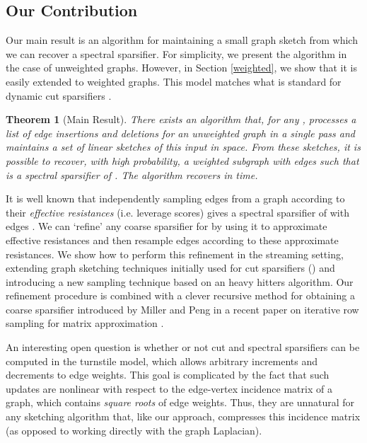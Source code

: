 \documentclass[11pt]{article}
\newtheorem{theorem}{Theorem}
\begin{document}
\subsection{Our Contribution}

Our main result is an algorithm for maintaining a small graph sketch from which we can recover a spectral sparsifier. For simplicity, we present the algorithm in the case of unweighted graphs. However, in Section \ref{weighted}, we show that it is easily extended to weighted graphs. This model matches what is standard for dynamic cut sparsifiers  \cite{gssss,goel2012single}. 

\begin{theorem}[Main Result]
\label{main_sparsification_theorem} There exists an algorithm that, for any , processes a  list of edge insertions and deletions for an unweighted graph  in a single pass and maintains a set of linear sketches of this input in  space. From these sketches, it is possible to recover, with high probability, a weighted subgraph  with  edges such that  is a  spectral sparsifier of . The algorithm 
recovers  in  time.
\end{theorem}

It is well known that independently sampling edges from a graph  according to their \emph{effective resistances} (i.e. leverage scores) gives a  spectral sparsifier of  with  edges \cite{graphSparsificationEffectiveResistance}. We can `refine' any coarse sparsifier for  by using it to approximate effective resistances and then resample edges according to these approximate resistances. We show how to perform this refinement in the streaming setting, extending graph sketching techniques initially used for cut sparsifiers (\cite{gssss,goel2012single}) and introducing a new sampling technique based on an  heavy hitters algorithm. Our refinement procedure is combined with a clever recursive method for obtaining a coarse sparsifier introduced by Miller and Peng in a recent paper on iterative row sampling for matrix approximation \cite{pengV1}.

An interesting open question is whether or not cut and spectral sparsifiers can be computed in the turnstile model, which allows arbitrary increments and decrements to edge weights. This goal is complicated by the fact that such updates are nonlinear with respect to the edge-vertex incidence matrix of a graph, which contains \emph{square roots} of edge weights. Thus, they are unnatural for any sketching algorithm that, like our approach, compresses this incidence matrix (as opposed to working directly with the graph Laplacian).
\fi
\end{document}
